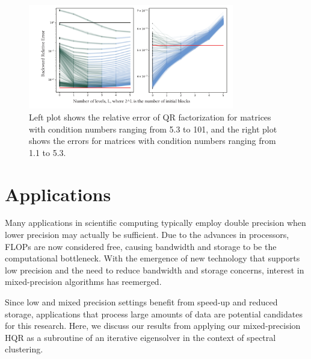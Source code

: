 \documentclass[review,onefignum,onetabnum]{siamart190516}
\begin{document}
\begin{figure}[h!]%
	\centering
	\includegraphics[width=0.8\textwidth]{./figures/allTSQR2.pdf}
	\caption{\label{fig:allTSQR} Left plot shows the relative error of QR factorization for matrices with condition numbers ranging from 5.3 to 101, and the right plot shows the errors for matrices with condition numbers ranging from 1.1 to 5.3. }
	\vspace{-10pt}
\end{figure} 

\section{Applications}
\label{sec:Apps}
Many applications in scientific computing typically employ double precision when lower precision may actually be sufficient. 
Due to the advances in processors, FLOPs are now considered free, causing bandwidth and storage to be the computational bottleneck. 
With the emergence of new technology that supports low precision and the need to reduce bandwidth and storage concerns, interest in mixed-precision algorithms has reemerged. 

Since low and mixed precision settings benefit from speed-up and reduced storage, applications that process large amounts of data are potential candidates for this research.
Here, we discuss our results from applying our mixed-precision HQR as a subroutine of an iterative eigensolver in the context of spectral clustering.\par
\end{document}

